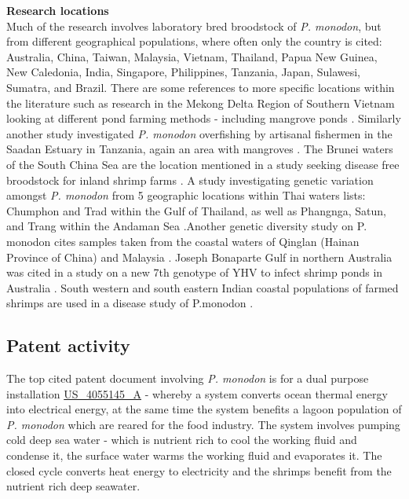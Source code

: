 \documentclass[openany]{book}
\theoremstyle{definition}
\theoremstyle{definition}
\theoremstyle{definition}
\theoremstyle{remark}
\begin{document}
\textbf{Research locations}\\
Much of the research involves laboratory bred broodstock of \emph{P.
monodon}, but from different geographical populations, where often only
the country is cited: Australia, China, Taiwan, Malaysia, Vietnam,
Thailand, Papua New Guinea, New Caledonia, India, Singapore,
Philippines, Tanzania, Japan, Sulawesi, Sumatra, and Brazil. There are
some references to more specific locations within the literature such as
research in the Mekong Delta Region of Southern Vietnam looking at
different pond farming methods - including mangrove ponds
\citep{Ha_2013}. Similarly another study investigated \emph{P. monodon}
overfishing by artisanal fishermen in the Saadan Estuary in Tanzania,
again an area with mangroves \citep{Mosha_2013}. The Brunei waters of
the South China Sea are the location mentioned in a study seeking
disease free broodstock for inland shrimp farms \citep{Claydon_2010}. A
study investigating genetic variation amongst \emph{P. monodon} from 5
geographic locations within Thai waters lists: Chumphon and Trad within
the Gulf of Thailand, as well as Phangnga, Satun, and Trang within the
Andaman Sea \citep{Supungul_2000}.Another genetic diversity study on P.
monodon cites samples taken from the coastal waters of Qinglan (Hainan
Province of China) and Malaysia \citep{Wang_2008}. Joseph Bonaparte Gulf
in northern Australia was cited in a study on a new 7th genotype of YHV
to infect shrimp ponds in Australia \citep{Mohr_2015}. South western and
south eastern Indian coastal populations of farmed shrimps are used in a
disease study of P.monodon \citep{Mohr_2015}.

\hypertarget{patent-activity-6}{%
\subsection{Patent activity}\label{patent-activity-6}}

The top cited patent document involving \emph{P. monodon} is for a dual
purpose installation
\href{https://www.lens.org/lens/patent/US_4055145_A}{US\_4055145\_A} -
whereby a system converts ocean thermal energy into electrical energy,
at the same time the system benefits a lagoon population of \emph{P.
monodon} which are reared for the food industry. The system involves
pumping cold deep sea water - which is nutrient rich to cool the working
fluid and condense it, the surface water warms the working fluid and
evaporates it. The closed cycle converts heat energy to electricity and
the shrimps benefit from the nutrient rich deep seawater.
\end{document}
